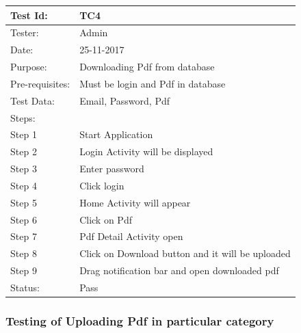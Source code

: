 \begin{center}
\begin{tabular}{ | m{5em} | m{5cm}|} 
\hline
Test Id: & TC4   \\ 
\hline
Tester: & Admin  \\ 
\hline
Date: & 25-11-2017  \\ 
\hline
Purpose: & Downloading Pdf from database   \\ 
\hline
Pre-requisites: & Must be login and Pdf in database  \\ 
\hline
Test Data: & Email, Password, Pdf    \\ 
\hline
Steps: &  \\
\hline  
Step 1 &  Start Application \\ 
Step 2 &  Login Activity will be displayed  \\ 
Step 3 &  Enter password  \\ 
Step 4 &  Click login  \\ 
Step 5 &  Home Activity will appear  \\ 
Step 6 &  Click on Pdf  \\
Step 7 &  Pdf Detail Activity open \\
Step 8 &  Click on Download button and it will be uploaded \\
Step 9 &  Drag notification bar and open downloaded pdf \\ 
\hline
Status: & Pass   \\ 
\hline
\end{tabular}
\end{center}

\subsubsection{Testing of Uploading Pdf in particular category} 	

